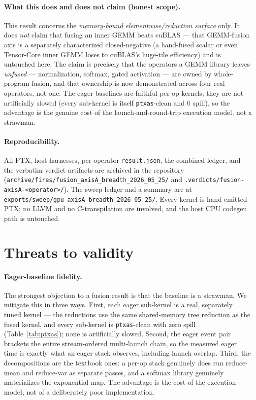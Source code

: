 \documentclass[11pt,a4paper]{article}
\begin{document}
\paragraph{What this does and does not claim (honest scope).} This result
concerns the \emph{memory-bound elementwise/reduction surface} only. It does
\emph{not} claim that fusing an inner GEMM beats cuBLAS --- that GEMM-fusion
axis is a separately characterized closed-negative (a hand-fused scalar or even
Tensor-Core inner GEMM loses to cuBLAS's huge-tile efficiency) and is untouched
here. The claim is precisely that the operators a GEMM library leaves
\emph{unfused} --- normalization, softmax, gated activation --- are owned by
whole-program fusion, and that ownership is now demonstrated across four real
operators, not one. The eager baselines are faithful per-op kernels; they are
not artificially slowed (every sub-kernel is itself \texttt{ptxas}-clean and
$0$ spill), so the advantage is the genuine cost of the launch-and-round-trip
execution model, not a strawman.

\paragraph{Reproducibility.} All PTX, host harnesses, per-operator
\texttt{result.json}, the combined ledger, and the verbatim verdict artifacts
are archived in the repository
(\texttt{archive/fires/fusion\_axisA\_breadth\_2026\_05\_25/} and
\texttt{.verdicts/fusion-axisA-<operator>/}). The sweep ledger and a summary are
at \texttt{exports/sweep/gpu-axisA-breadth-2026-05-25/}. Every kernel is
hand-emitted PTX; no LLVM and no C-transpilation are involved, and the host CPU
codegen path is untouched.

\section{Threats to validity}
\label{sec:threats}

\paragraph{Eager-baseline fidelity.} The strongest objection to a fusion result
is that the baseline is a strawman. We mitigate this in three ways. First, each
eager sub-kernel is a real, separately tuned kernel --- the reductions use the
same shared-memory tree reduction as the fused kernel, and every sub-kernel is
\texttt{ptxas}-clean with zero spill (Table~\ref{tab:ptxas}); none is
artificially slowed. Second, the eager event pair brackets the entire
stream-ordered multi-launch chain, so the measured eager time is exactly what an
eager stack observes, including launch overlap. Third, the decompositions are
the textbook ones: a per-op stack genuinely does run reduce-mean and reduce-var
as separate passes, and a softmax library genuinely materializes the
exponential map. The advantage is the cost of the execution model, not of a
deliberately poor implementation.
\end{document}
